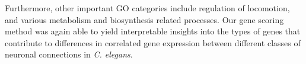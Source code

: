 \documentclass[10pt,letterpaper]{article}
\begin{document}
{Furthermore, other important GO categories include regulation of locomotion, and various metabolism and biosynthesis related processes. 
Our gene scoring method was again able to yield interpretable insights into the types of genes that contribute to differences in correlated gene expression between different classes of neuronal connections in \emph{C. elegans}.





}
\end{document}
